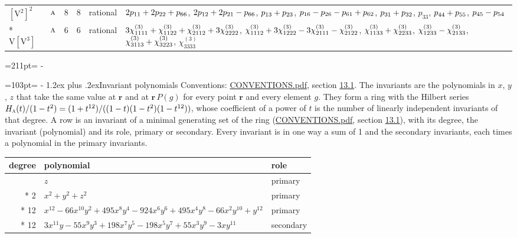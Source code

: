 \documentclass[10pt,a4paper]{article}
\makeatletter
\renewcommand\section{\@startsection{section}{1}{\z@}{-3ex plus -1ex minus -.2ex}%
  {1.2ex plus .2ex}{\normalfont\large\sffamily\bfseries\color{parttitle}}}
\newcommand{\needspace}[1]{\par\penalty-100\begingroup\dimen0=#1\relax\dimen2=\pagegoal
  \advance\dimen2-\pagetotal\ifdim\dimen0>\dimen2\relax\ifdim\dimen2>0pt\vfil\break\fi\fi
  \endgroup}
\numberwithin{equation}{section}
\newcommand{\irr}[1]{\text{\normalfont\scshape #1}}
\newcommand{\pointr}{\mathbf{r}}
\newcommand{\jahn}[1]{\mathrm{#1}}
\newlength{\fillwidth}\newlength{\cellwidth}\newlength{\colwidth}
\newcommand{\signbreak}{\penalty100\relax}
\makeatother
\begin{document}
{\begin{longtable}{@{}llrrl>{\RaggedRight\arraybackslash}p{\fillwidth}@{}}
$\jahn{[V^{2}]^{2}}$ & $\irr{a}$ & 8 & 8 & rational & $2p_{11} +\signbreak 2p_{22} +\signbreak p_{66}$, $2p_{12} +\signbreak 2p_{21} -\signbreak p_{66}$, $p_{13} +\signbreak p_{23}$, $p_{16} -\signbreak p_{26} -\signbreak p_{61} +\signbreak p_{62}$, $p_{31} +\signbreak p_{32}$, $p_{33}$, $p_{44} +\signbreak p_{55}$, $p_{45} -\signbreak p_{54}$\\*
$\jahn{V[V^{3}]}$ & $\irr{a}$ & 6 & 6 & rational & $3\chi^{(3)}_{1111} +\signbreak \chi^{(3)}_{1122} +\signbreak \chi^{(3)}_{2112} +\signbreak 3\chi^{(3)}_{2222}$, $\chi^{(3)}_{1112} +\signbreak 3\chi^{(3)}_{1222} -\signbreak 3\chi^{(3)}_{2111} -\signbreak \chi^{(3)}_{2122}$, $\chi^{(3)}_{1133} +\signbreak \chi^{(3)}_{2233}$, $\chi^{(3)}_{1233} -\signbreak \chi^{(3)}_{2133}$, $\chi^{(3)}_{3113} +\signbreak \chi^{(3)}_{3223}$, $\chi^{(3)}_{3333}$\\
\bottomrule\end{longtable}}
\needspace{211pt}
\needspace{103pt}
\section{Invariant polynomials}\label{s:invariant_polynomials}
Conventions: \href{../../CONVENTIONS.pdf}{CONVENTIONS.pdf}, section \href{../../CONVENTIONS.pdf\#conv.13.1}{13.1}.
The invariants are the polynomials in $x$, $y$, $z$ that take the same value at $\pointr$ and at $\pointr\,P(g)$ for every point $\pointr$ and every element $g$. They form a ring with the Hilbert series $H_{\irr{a}}(t)/(1-t^{2}) = (1 + t^{12})/((1-t)(1-t^{2})(1-t^{12}))$, whose coefficient of a power of $t$ is the number of linearly independent invariants of that degree. \label{n:head.degree}\label{n:head.role}A row is an invariant of a minimal generating set of the ring (\href{../../CONVENTIONS.pdf}{CONVENTIONS.pdf}, section \href{../../CONVENTIONS.pdf\#conv.13.1}{13.1}), with its degree, the invariant (polynomial) and its role, primary or secondary. Every invariant is in one way a sum of 1 and the secondary invariants, each times a polynomial in the primary invariants.
{\small\begin{longtable}{@{}rll@{}}\toprule
degree & polynomial & role\\\midrule\endhead
\bottomrule\endfoot\endlastfoot
1 & $z$ & primary\\*
2 & $x^{2} + y^{2} + z^{2}$ & primary\\*
12 & $x^{12} - 66x^{10}y^{2} + 495x^{8}y^{4} - 924x^{6}y^{6} + 495x^{4}y^{8} - 66x^{2}y^{10} + y^{12}$ & primary\\*
12 & $3x^{11}y - 55x^{9}y^{3} + 198x^{7}y^{5} - 198x^{5}y^{7} + 55x^{3}y^{9} - 3xy^{11}$ & secondary\\
\bottomrule\end{longtable}}
\end{document}
